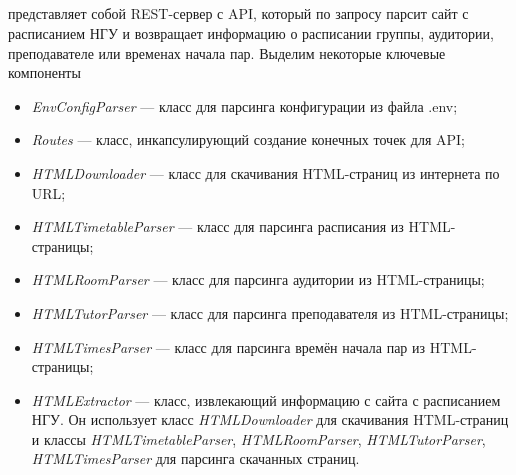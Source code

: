 		\subsection{\Backend{}}	
			\begin{figure}[H]
				\centering
				\def\svgwidth{\columnwidth}
				
			\end{figure}
			
			\Backendbf{} представляет собой REST-сервер с API, который по запросу парсит сайт с расписанием НГУ и возвращает информацию о расписании группы, аудитории, преподавателе или временах начала пар. Выделим некоторые ключевые компоненты
			
			\begin{itemize}
				\item \textit{EnvConfigParser} --- класс для парсинга конфигурации из файла .env;
				
				\item \textit{Routes} --- класс, инкапсулирующий создание конечных точек для API;
				
				\item \textit{HTMLDownloader} --- класс для скачивания HTML-страниц из интернета по URL;
				
				\item \textit{HTMLTimetableParser} --- класс для парсинга расписания из HTML-страницы;
				
				\item \textit{HTMLRoomParser} --- класс для парсинга аудитории из HTML-страницы;
				
				\item \textit{HTMLTutorParser} --- класс для парсинга преподавателя из HTML-страницы;
				
				\item \textit{HTMLTimesParser} --- класс для парсинга времён начала пар из HTML-страницы;
				
				\item \textit{HTMLExtractor} --- класс, извлекающий информацию с сайта с расписанием НГУ. Он использует класс \textit{HTMLDownloader} для скачивания HTML-страниц и 
				классы \textit{HTMLTimetableParser}, \textit{HTMLRoomParser}, \textit{HTMLTutorParser}, \textit{HTMLTimesParser} для парсинга скачанных страниц.
			\end{itemize}

